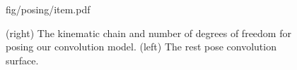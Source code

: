 \begin{figure}[t!]
\centering
\begin{overpic} 
[width=\linewidth]
{fig/posing/item.pdf}
\end{overpic}
\caption{
% 
% 
(right) The kinematic chain and number of degrees of freedom for posing our convolution model.
%
(left) The rest pose convolution surface.
%
% 
% 
}
\label{fig:posing}
\end{figure}
